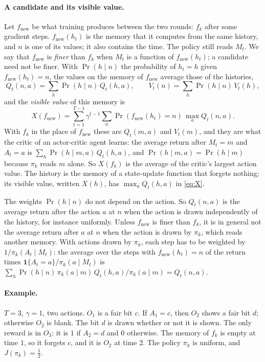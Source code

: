 \documentclass[11pt]{article}
\theoremstyle{definition}
\newcommand{\fn}{f_{\mathrm{new}}}
\begin{document}
\paragraph{A candidate and its visible value.} Let $\fn$ be what training produces between the two rounds: $f_k$ after some gradient steps. $\fn(h_t)$ is the memory that it computes from the same history, and $n$ is one of its values; it also contains the time. The policy still reads $M_t$. We say that $\fn$ is \emph{finer} than $f_k$ when $M_t$ is a function of $\fn(h_t)$; a candidate need not be finer. With $\Pr(h\mid n)$ the probability of $h_t=h$ given $\fn(h_t)=n$, the values on the memory of $\fn$ average those of the histories,
\[
Q_t(n,a)=\sum_h\Pr(h\mid n)\,Q_t(h,a),\qquad V_t(n)=\sum_h\Pr(h\mid n)\,V_t(h),
\]
and the \emph{visible value} of this memory is
\begin{equation}\label{eq:X}
X(\fn)=\sum_{t=1}^{T-1}\gamma^{t-1}\sum_n\Pr(\fn(h_t)=n)\,\max_aQ_t(n,a).
\end{equation}
With $f_k$ in the place of $\fn$ these are $Q_t(m,a)$ and $V_t(m)$, and they are what the critic of an actor-critic agent learns: the average return after $M_t=m$ and $A_t=a$ is $\sum_h\Pr(h\mid m,a)\,Q_t(h,a)$, and $\Pr(h\mid m,a)=\Pr(h\mid m)$ because $\pi_k$ reads $m$ alone. So $X(f_k)$ is the average of the critic's largest action value. The history is the memory of a state-update function that forgets nothing; its visible value, written $X(h)$, has $\max_aQ_t(h,a)$ in \eqref{eq:X}.

The weights $\Pr(h\mid n)$ do not depend on the action. So $Q_t(n,a)$ is the average return after the action $a$ at $n$ when the action is drawn independently of the history, for instance uniformly. Unless $\fn$ is finer than $f_k$, it is in general not the average return after $a$ at $n$ when the action is drawn by $\pi_k$, which reads another memory. With actions drawn by $\pi_k$, each step has to be weighted by $1/\pi_k(A_t\mid M_t)$: the average over the steps with $\fn(h_t)=n$ of the return times $\mathbf 1\{A_t=a\}/\pi_k(a\mid M_t)$ is $\sum_h\Pr(h\mid n)\,\pi_k(a\mid m)\,Q_t(h,a)/\pi_k(a\mid m)=Q_t(n,a)$.

\paragraph{Example.} $T=3$, $\gamma=1$, two actions. $O_1$ is a fair bit $c$. If $A_1=c$, then $O_2$ shows a fair bit $d$; otherwise $O_2$ is blank. The bit $d$ is drawn whether or not it is shown. The only reward is in $O_3$: it is $1$ if $A_2=d$ and $0$ otherwise. The memory of $f_k$ is empty at time $1$, so it forgets $c$, and it is $O_2$ at time $2$. The policy $\pi_k$ is uniform, and $J(\pi_k)=\tfrac12$.
\end{document}
